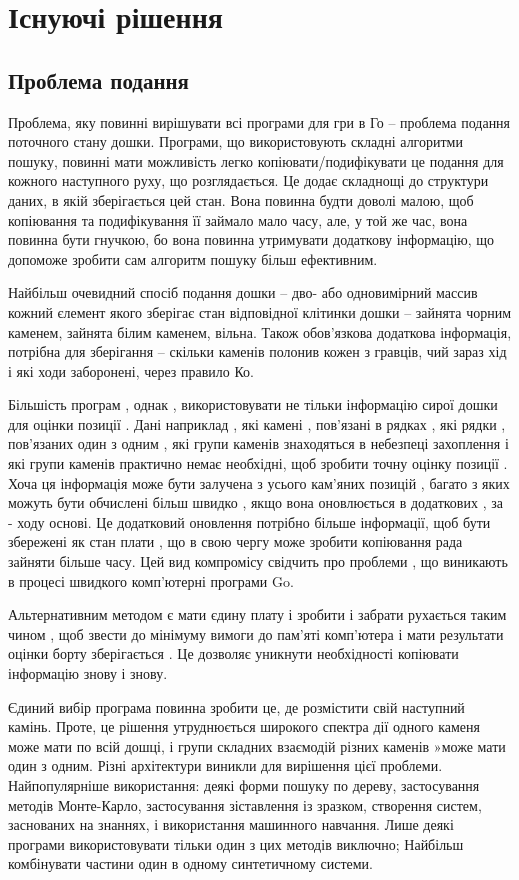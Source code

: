 \section{Існуючі рішення}
\subsection{Проблема подання}
Проблема, яку повинні вирішувати всі програми для гри в Го -- проблема подання поточного стану дошки. Програми, що використовують складні алгоритми пошуку, повинні мати можливість легко копіювати/подифікувати це подання для кожного наступного руху, що розглядається. Це додає складнощі до структури даних, в якій зберігається цей стан. Вона повинна будти доволі малою, щоб копіювання та подифікування її займало мало часу, але, у той же час, вона повинна бути гнучкою, бо вона повинна утримувати додаткову інформацію, що допоможе зробити сам алгоритм пошуку більш ефективним.

Найбільш очевидний спосіб подання дошки -- дво- або одновимірний массив кожний єлемент якого зберігає стан відповідної клітинки дошки -- зайнята чорним каменем, зайнята білим каменем, вільна. Також обов'язкова додаткова інформація, потрібна для зберігання -- скільки каменів полонив кожен з гравців, чий зараз хід і які ходи заборонені, через правило Ко.

Більшість програм , однак , використовувати не тільки інформацію сирої дошки для оцінки позиції . Дані наприклад , які камені , пов'язані в рядках , які рядки , пов'язаних один з одним , які групи каменів знаходяться в небезпеці захоплення і які групи каменів практично немає необхідні, щоб зробити точну оцінку позиції . Хоча ця інформація може бути залучена з усього кам'яних позицій , багато з яких можуть бути обчислені більш швидко , якщо вона оновлюється в додаткових , за - ходу основі. Це додатковий оновлення потрібно більше інформації, щоб бути збережені як стан плати , що в свою чергу може зробити копіювання рада зайняти більше часу. Цей вид компромісу свідчить про проблеми , що виникають в процесі швидкого комп'ютерні програми Go.

Альтернативним методом є мати єдину плату і зробити і забрати рухається таким чином , щоб звести до мінімуму вимоги до пам'яті комп'ютера і мати результати оцінки борту зберігається . Це дозволяє уникнути необхідності копіювати інформацію знову і знову.


Єдиний вибір програма повинна зробити це, де розмістити свій наступний камінь. Проте, це рішення утруднюється широкого спектра дії одного каменя може мати по всій дошці, і групи складних взаємодій різних каменів »може мати один з одним. Різні архітектури виникли для вирішення цієї проблеми. Найпопулярніше використання: деякі форми пошуку по дереву, застосування методів Монте-Карло, застосування зіставлення із зразком, створення систем, заснованих на знаннях, і використання машинного навчання. Лише деякі програми використовувати тільки один з цих методів виключно; Найбільш комбінувати частини один в одному синтетичному системи.


